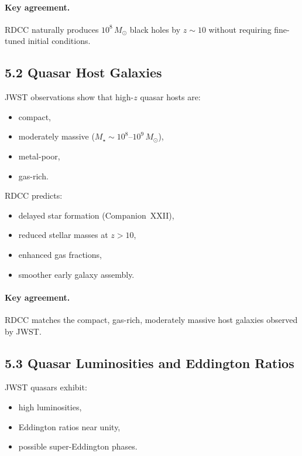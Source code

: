 \documentclass[11pt,a4paper]{article}
\begin{document}
\paragraph{Key agreement.}
RDCC naturally produces $10^{8}\,M_{\odot}$ black holes by $z \sim 10$ without requiring 
fine-tuned initial conditions.

\subsection*{5.2 Quasar Host Galaxies}

JWST observations show that high-$z$ quasar hosts are:

\begin{itemize}
    \item compact,
    \item moderately massive ($M_{\star} \sim 10^{8}$–$10^{9}\,M_{\odot}$),
    \item metal-poor,
    \item gas-rich.
\end{itemize}

RDCC predicts:

\begin{itemize}
    \item delayed star formation (Companion~XXII),
    \item reduced stellar masses at $z > 10$,
    \item enhanced gas fractions,
    \item smoother early galaxy assembly.
\end{itemize}

\paragraph{Key agreement.}
RDCC matches the compact, gas-rich, moderately massive host galaxies observed by JWST.

\subsection*{5.3 Quasar Luminosities and Eddington Ratios}

JWST quasars exhibit:

\begin{itemize}
    \item high luminosities,
    \item Eddington ratios near unity,
    \item possible super-Eddington phases.
\end{itemize}
\end{document}
